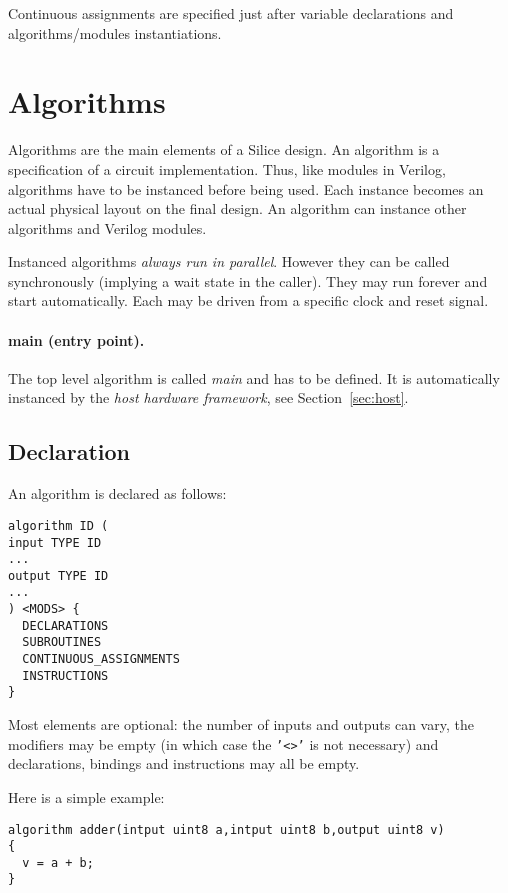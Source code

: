 \documentclass[a4]{article}
\newcommand\verilog{Verilog}
\newcommand\silice{Silice}
\begin{document}
Continuous assignments are specified just after variable declarations and algorithms/modules instantiations.


\section{Algorithms}

Algorithms are the main elements of a \silice{} design. An algorithm is a specification of a circuit implementation. Thus, like modules in \verilog{}, algorithms have to be instanced before being used. Each instance becomes an actual physical layout on the final design.
An algorithm can instance other algorithms and \verilog{} modules. 

Instanced algorithms \textit{always run in parallel}. However they can be called synchronously (implying a wait state in the caller). They may run forever and start automatically. Each may be driven from a specific clock and reset signal.

\paragraph{main (entry point).}
The top level algorithm is called \textit{main} and has to be defined. It is automatically instanced by the \textit{host hardware framework}, see Section~\ref{sec:host}.


\subsection{Declaration}

An algorithm is declared as follows:
\begin{verbatim}
algorithm ID (
input TYPE ID
...
output TYPE ID
...
) <MODS> {
  DECLARATIONS
  SUBROUTINES
  CONTINUOUS_ASSIGNMENTS
  INSTRUCTIONS
}
\end{verbatim}

Most elements are optional: the number of inputs and outputs can vary, the modifiers may be empty (in which case the \texttt{'<>'} is not necessary) and declarations, bindings and instructions may all be empty.

Here is a simple example:
\begin{verbatim}
algorithm adder(intput uint8 a,intput uint8 b,output uint8 v)
{
  v = a + b;
}
\end{verbatim}
\end{document}
